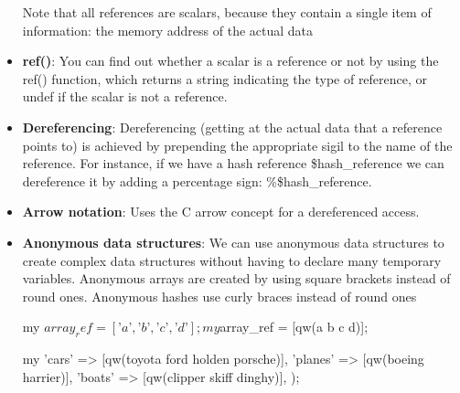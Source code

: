 \documentclass{report}
\begin{document}
\begin{itemize}
            \bigbreak \noindent 
            Note that all references are scalars, because they contain a single item of information: the memory address of the actual data
        \item \textbf{ref()}: You can find out whether a scalar is a reference or not by using the ref() function, which returns a string indicating the type of reference, or undef if the scalar is not a reference.
        \item \textbf{Dereferencing}: Dereferencing (getting at the actual data that a reference points to) is achieved by prepending the appropriate sigil to the name of the reference. For instance, if we have a hash reference \$hash\_reference we can dereference it by adding a percentage sign: \%\$hash\_reference.
        \item \textbf{Arrow notation}: Uses the C arrow concept for a dereferenced access.
            \bigbreak \noindent 
        \item \textbf{Anonymous data structures}: We can use anonymous data structures to create complex data structures without having to declare many temporary variables. Anonymous arrays are created by using square brackets instead of round ones. Anonymous hashes use curly braces instead of round ones
            \bigbreak \noindent 
            \begin{perlcode}
            my $array_ref = [’a’, ’b’, ’c’, ’d’];
            my $array_ref = [qw(a b c d)];

            my %
                ’cars’ => [qw(toyota ford holden porsche)],
                ’planes’ => [qw(boeing harrier)],
                ’boats’ => [qw(clipper skiff dinghy)],
            );


\end{perlcode}
\end{itemize}
\end{document}
